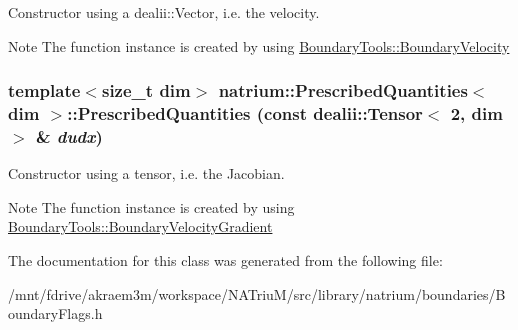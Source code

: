 Constructor using a dealii::Vector, i.e. the velocity. \begin{DoxyNote}{Note}
The function instance is created by using \hyperlink{classnatrium_1_1BoundaryTools_1_1BoundaryVelocity}{BoundaryTools::BoundaryVelocity} 
\end{DoxyNote}
\hypertarget{classnatrium_1_1PrescribedQuantities_a3c4ac1b172d9bcd2f365a8b2c258e001}{
\subsubsection[{PrescribedQuantities}]{\setlength{\rightskip}{0pt plus 5cm}template$<$size\_\-t dim$>$ {\bf natrium::PrescribedQuantities}$<$ dim $>$::{\bf PrescribedQuantities} (const dealii::Tensor$<$ 2, dim $>$ \& {\em dudx})}}
\label{classnatrium_1_1PrescribedQuantities_a3c4ac1b172d9bcd2f365a8b2c258e001}


Constructor using a tensor, i.e. the Jacobian. \begin{DoxyNote}{Note}
The function instance is created by using \hyperlink{classnatrium_1_1BoundaryTools_1_1BoundaryVelocityGradient}{BoundaryTools::BoundaryVelocityGradient} 
\end{DoxyNote}


The documentation for this class was generated from the following file:\begin{DoxyCompactItemize}
\item 
/mnt/fdrive/akraem3m/workspace/NATriuM/src/library/natrium/boundaries/BoundaryFlags.h\end{DoxyCompactItemize}
